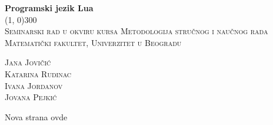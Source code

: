 \documentclass[a4paper]{article}
\begin{document}
	\begin{titlepage}
		\begin{center}
			\huge{\bfseries Programski jezik Lua} \\
			[2mm]
			\line(1, 0){300} \\
			[1.5cm]
			\textsc{\large Seminarski rad u okviru kursa Metodologija stručnog i naučnog rada \\
				Matematički fakultet, Univerzitet u Beogradu} \\
			[10cm]
		\end{center}
	
	\begin{flushright}
		\textsc{\large Jana Jovičić \\
		Katarina Rudinac \\
		Ivana Jordanov \\
		Jovana Pejkić \\}
	\end{flushright}
	\end{titlepage}
Nova strana ovde
\end{document}

